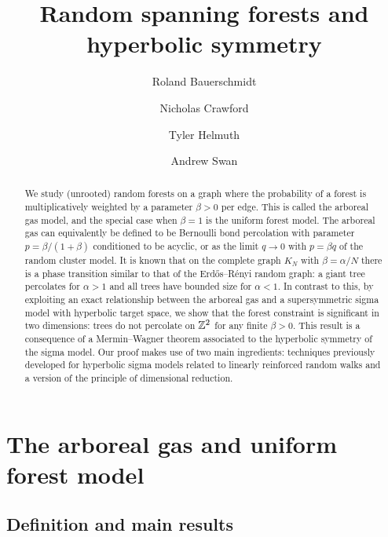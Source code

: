 \documentclass[11pt]{amsart}
\title{Random spanning forests and hyperbolic symmetry}
\author{Roland Bauerschmidt}
\author{Nicholas Crawford}
\author{Tyler Helmuth}
\author{Andrew Swan}
\numberwithin{equation}{section}
\numberwithin{theorem}{section}
\begin{document}
\maketitle

\begin{abstract}
  We study (unrooted) random forests on a graph where the probability of a forest
  is multiplicatively weighted by a parameter $\beta>0$ per
  edge. This is called the arboreal gas model, and the special case
  when $\beta=1$ is the uniform forest model. 
  The arboreal gas can
  equivalently be defined to be Bernoulli bond percolation with parameter
  $p=\beta/(1+\beta)$ conditioned to be acyclic,
  or as the limit $q\to 0$ with $p=\beta q$ of the random cluster model.
  It is known that on the complete graph $K_{N}$ with
  $\beta=\alpha/N$ there is a phase transition similar to that of the
  Erd\H{o}s--R\'enyi random graph: a giant tree percolates for
  $\alpha > 1$ and all trees have bounded size for $\alpha<1$.
  In contrast to this, by exploiting an exact relationship between the
  arboreal gas and a supersymmetric sigma model with hyperbolic target
  space, we show that the forest constraint is significant in two
  dimensions: trees do not percolate on $\mathbb{Z}^2$ for any finite $\beta>0$. 
  This result is a consequence of a Mermin--Wagner theorem associated
  to the hyperbolic symmetry of the sigma model.
  Our proof makes use of two main ingredients:
  techniques previously developed for hyperbolic sigma models related
  to linearly reinforced random walks and a version of the principle of
  dimensional reduction.
\end{abstract}


\section{The arboreal gas and uniform forest model}
\label{sec:model}

\subsection{Definition and main results}
\label{sec:intro-defn}
\end{document}
